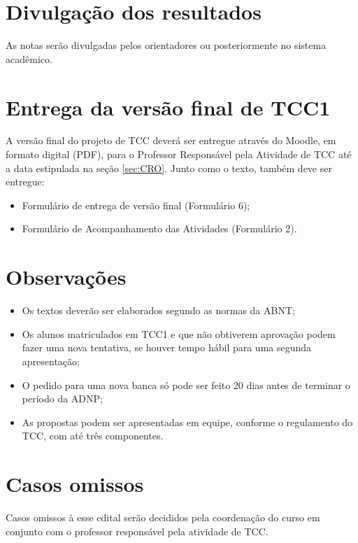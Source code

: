 \documentclass[a4paper, 12pt]{article}
\begin{document}
	\section{Divulgação dos resultados}
	
	As notas serão divulgadas pelos orientadores ou posteriormente no sistema acadêmico.
	
	\section{Entrega da versão final de TCC1}
	
	A versão final do projeto de TCC deverá ser entregue através do Moodle, em formato digital (PDF), para o Professor Responsável pela Atividade de TCC até a data estipulada na seção \ref{sec:CRO}. Junto como o texto, também deve ser entregue:
	
	\begin{itemize}
		\item Formulário de entrega de versão final (Formulário 6);
		\item Formulário de Acompanhamento das Atividades (Formulário 2).
	\end{itemize}
	
	\section{Observações}
	
	\begin{itemize}
		\item Os textos deverão ser elaborados segundo as normas da ABNT;
		
		\item Os alunos matriculados em TCC1 e que não obtiverem aprovação podem fazer uma nova tentativa, se houver tempo hábil para uma segunda apresentação;
		
		\item O pedido para uma nova banca só pode ser feito 20 dias antes de terminar o período da ADNP;
		
		\item As propostas podem ser apresentadas em equipe, conforme o regulamento do TCC, com até três componentes.
	\end{itemize}


	\section{Casos omissos}

	Casos omissos à esse edital serão decididos pela coordenação do curso em conjunto com o professor responsável pela atividade de TCC.
\end{document}
